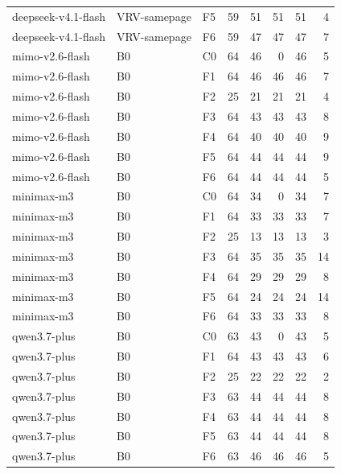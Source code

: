 \begin{tabular}{lllrrrrr}
deepseek-v4.1-flash & VRV-samepage & F5 & 59 & 51 & 51 & 51 & 4 \\
deepseek-v4.1-flash & VRV-samepage & F6 & 59 & 47 & 47 & 47 & 7 \\
mimo-v2.6-flash & B0 & C0 & 64 & 46 & 0 & 46 & 5 \\
mimo-v2.6-flash & B0 & F1 & 64 & 46 & 46 & 46 & 7 \\
mimo-v2.6-flash & B0 & F2 & 25 & 21 & 21 & 21 & 4 \\
mimo-v2.6-flash & B0 & F3 & 64 & 43 & 43 & 43 & 8 \\
mimo-v2.6-flash & B0 & F4 & 64 & 40 & 40 & 40 & 9 \\
mimo-v2.6-flash & B0 & F5 & 64 & 44 & 44 & 44 & 9 \\
mimo-v2.6-flash & B0 & F6 & 64 & 44 & 44 & 44 & 5 \\
minimax-m3 & B0 & C0 & 64 & 34 & 0 & 34 & 7 \\
minimax-m3 & B0 & F1 & 64 & 33 & 33 & 33 & 7 \\
minimax-m3 & B0 & F2 & 25 & 13 & 13 & 13 & 3 \\
minimax-m3 & B0 & F3 & 64 & 35 & 35 & 35 & 14 \\
minimax-m3 & B0 & F4 & 64 & 29 & 29 & 29 & 8 \\
minimax-m3 & B0 & F5 & 64 & 24 & 24 & 24 & 14 \\
minimax-m3 & B0 & F6 & 64 & 33 & 33 & 33 & 8 \\
qwen3.7-plus & B0 & C0 & 63 & 43 & 0 & 43 & 5 \\
qwen3.7-plus & B0 & F1 & 64 & 43 & 43 & 43 & 6 \\
qwen3.7-plus & B0 & F2 & 25 & 22 & 22 & 22 & 2 \\
qwen3.7-plus & B0 & F3 & 63 & 44 & 44 & 44 & 8 \\
qwen3.7-plus & B0 & F4 & 63 & 44 & 44 & 44 & 8 \\
qwen3.7-plus & B0 & F5 & 63 & 44 & 44 & 44 & 8 \\
qwen3.7-plus & B0 & F6 & 63 & 46 & 46 & 46 & 5 \\
\bottomrule
\end{tabular}
